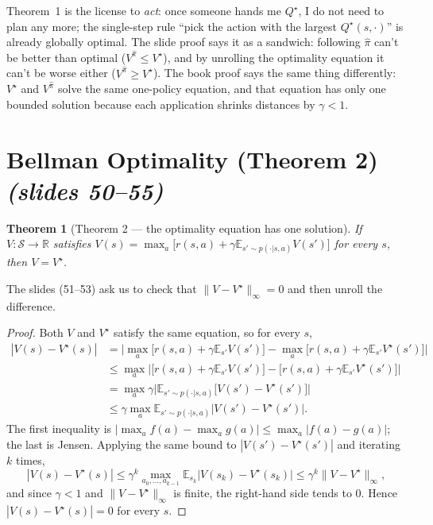 \documentclass[11pt,a4paper]{article}
\newcommand{\E}{\mathbb{E}}
\newcommand{\slr}[1]{\texorpdfstring{\emph{(slides #1)}}{(slides #1)}}
\newcommand{\cS}{\mathcal{S}}
\theoremstyle{plain}
\newtheorem{theorem}{Theorem}[section]
\theoremstyle{definition}
\theoremstyle{remark}
\begin{document}
\begin{intuition}
Theorem~1 is the license to \emph{act}: once someone hands me $Q^\star$, I do not need to plan any more; the single-step rule ``pick the action with the largest $Q^\star(s,\cdot)$'' is already globally optimal. The slide proof says it as a sandwich: following $\hat\pi$ can't be better than optimal ($V^{\hat\pi}\le V^\star$), and by unrolling the optimality equation it can't be worse either ($V^{\hat\pi}\ge V^\star$). The book proof says the same thing differently: $V^\star$ and $V^{\hat\pi}$ solve the same one-policy equation, and that equation has only one bounded solution because each application shrinks distances by $\gamma<1$.
\end{intuition}

\section{Bellman Optimality (Theorem 2) \slr{50--55}}
\begin{theorem}[Theorem 2 --- the optimality equation has one solution]\label{thm:unique}
If $V:\cS\to\mathbb R$ satisfies $V(s)=\max_a\big[r(s,a)+\gamma\E_{s'\sim p(\cdot|s,a)}V(s')\big]$ for every $s$, then $V=V^\star$.
\end{theorem}
The slides (51--53) ask us to check that $\|V-V^\star\|_\infty=0$ and then unroll the difference.
\begin{proof}
Both $V$ and $V^\star$ satisfy the same equation, so for every $s$,
\begin{align*}
|V(s)-V^\star(s)|&=\Big|\max_a\big[r(s,a)+\gamma\E_{s'}V(s')\big]-\max_a\big[r(s,a)+\gamma\E_{s'}V^\star(s')\big]\Big|\\
&\le\max_a\Big|\big[r(s,a)+\gamma\E_{s'}V(s')\big]-\big[r(s,a)+\gamma\E_{s'}V^\star(s')\big]\Big|\\
&=\max_a\gamma\Big|\E_{s'\sim p(\cdot|s,a)}\big[V(s')-V^\star(s')\big]\Big|\\
&\le\gamma\max_a\E_{s'\sim p(\cdot|s,a)}\big|V(s')-V^\star(s')\big|.
\end{align*}
The first inequality is $|\max_af(a)-\max_ag(a)|\le\max_a|f(a)-g(a)|$; the last is Jensen. Applying the same bound to $|V(s')-V^\star(s')|$ and iterating $k$ times,
\[
|V(s)-V^\star(s)|\le\gamma^k\max_{a_0,\dots,a_{k-1}}\E_{s_k}\big|V(s_k)-V^\star(s_k)\big|\le\gamma^k\|V-V^\star\|_\infty,
\]
and since $\gamma<1$ and $\|V-V^\star\|_\infty$ is finite, the right-hand side tends to $0$. Hence $|V(s)-V^\star(s)|=0$ for every $s$.
\end{proof}
\end{document}
